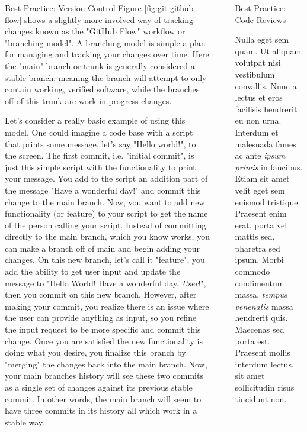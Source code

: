 \documentclass[final]{beamer}
\newlength{\sepwidth}
\newlength{\colwidth}
\newcommand{\separatorcolumn}{\begin{column}{\sepwidth}\end{column}}
\begin{document}
\begin{frame}[t]
\begin{columns}[t]
\begin{column}{\colwidth}
\begin{block}{Best Practice: Version Control}
    Figure \ref*{fig:git-github-flow} shows a slightly more involved way of
    tracking changes known as the "GitHub Flow" workflow or "branching model".
    A branching model is simple a plan for managing and tracking your changes
    over time.
    Here the "main" branch or trunk is generally considered a stable branch;
    meaning the branch will attempt to only contain working, verified software,
    while the branches off of this trunk are work in progress changes.
    
    Let's consider a really basic example of using this model.
    One could imagine a code base with a script that prints some message, let's
    say "Hello world!", to the screen.
    The first commit, i.e. "initial commit", is just this simple script with
    the functionality to print your message.
    You add to the script an addition part of the message "Have a wonderful
    day!" and commit this change to the main branch.
    Now, you want to add new functionality (or feature) to your script to get
    the name of the person calling your script.
    Instead of committing directly to the main branch, which you know works, you
    can make a branch off of main and begin adding your changes.
    On this new branch, let's call it "feature", you add the ability to get user
    input and update the message to "Hello World! Have a wonderful day,
    \textit{User}!", then you commit on this new branch.
    However, after making your commit, you realize there is an issue where the
    user can provide anything as input, so you refine the input request to be
    more specific and commit this change.
    Once you are satisfied the new functionality is doing what you desire, you
    finalize this branch by "merging" the changes back into the main branch.
    Now, your main branches history will see these two commits as a single
    set of changes against its previous stable commit.
    In other words, the main branch will seem to have three commits in its
    history all which work in a stable way.

  \end{block}

\end{column}

\separatorcolumn

\begin{column}{\colwidth}

  \begin{block}{Best Practice: Code Reviews}

    Nulla eget sem quam. Ut aliquam volutpat nisi vestibulum convallis. Nunc a
    lectus et eros facilisis hendrerit eu non urna. Interdum et malesuada fames
    ac ante \textit{ipsum primis} in faucibus. Etiam sit amet velit eget sem
    euismod tristique. Praesent enim erat, porta vel mattis sed, pharetra sed
    ipsum. Morbi commodo condimentum massa, \textit{tempus venenatis} massa
    hendrerit quis. Maecenas sed porta est. Praesent mollis interdum lectus,
    sit amet sollicitudin risus tincidunt non.


\end{block}
\end{column}
\end{columns}
\end{frame}
\end{document}

